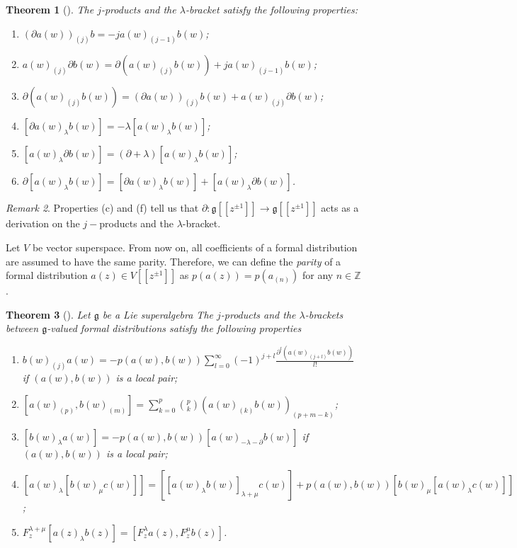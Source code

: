 \documentclass[a4paper, 12pt, reqno]{amsart}
\newtheorem{theorem}{Theorem}[subsection]
\theoremstyle{remark}
\newtheorem{remark}[theorem]{Remark}
\numberwithin{equation}{subsection}
\begin{document}
\begin{theorem}[{\cite[\S2.3]{nozaradan_introduction_2008}}]
  \label{thr:3}
  The $j$-products and the $\lambda$-bracket satisfy the following properties:
  \begin{enumerate}
  \item $(\partial a(w))_{(j)}b = -ja(w)_{(j - 1)}b(w)$;
  \item $a(w)_{(j)}\partial b(w) = \partial(a(w)_{(j)}b(w)) + ja(w)_{(j - 1)}b(w)$;
  \item $\partial(a(w)_{(j)}b(w))=(\partial a(w))_{(j)}b(w)+a(w)_{(j)}\partial b(w)$;
  \item $[\partial a(w)_{\lambda}b(w)] = -\lambda [a(w)_{\lambda}b(w)]$;
  \item $[a(w)_{\lambda}\partial b(w)] = (\partial + \lambda)[a(w)_{\lambda}b(w)]$;
  \item $\partial[a(w)_\lambda b(w)]=[\partial a(w)_\lambda b(w)]+[a(w)_\lambda \partial b(w)]$.
  \end{enumerate}
\end{theorem}
\begin{remark}
  \label{rmk:3}
  Properties (c) and (f) tell us that $\partial: \mathfrak{g}[[z^{\pm 1}]] \to \mathfrak{g}[[z^{\pm 1}]]$ acts as a derivation on the $j-$products and the $\lambda$-bracket.
\end{remark}

Let $V$ be vector superspace.
From now on, all coefficients of a formal distribution are assumed to have the same parity.
Therefore, we can define the \emph{parity} of a formal distribution $a(z) \in V[[z^{\pm 1}]]$ as $p(a(z)) = p(a_{(n)})$ for any $n \in \mathbb{Z}$.

\begin{theorem}[{\cite[\S2.3]{nozaradan_introduction_2008}}]
  \label{thr:4}
  Let $\mathfrak{g}$ be a Lie superalgebra
  The $j$-products and the $\lambda$-brackets between $\mathfrak{g}$-valued formal distributions satisfy the following properties
  \begin{enumerate}
  \item $b(w)_{(j)}a(w) = -p(a(w), b(w))\sum_{l = 0}^{\infty}(-1)^{j + l}\frac{\partial^l(a(w)_{(j + l)}b(w))}{l!}$ if $(a(w), b(w))$ is a local pair;
  \item $[a(w)_{(p)}, b(w)_{(m)}] = \sum_{k = 0}^p\binom{p}{k}(a(w)_{(k)}b(w))_{(p + m - k)}$;
  \item $[b(w)_{\lambda}a(w)] = -p(a(w), b(w))[a(w)_{-\lambda - \partial}b(w)]$ if $(a(w), b(w))$ is a local pair;
  \item $[a(w)_{\lambda}[b(w)_{\mu}c(w)]] = [[a(w)_{\lambda}b(w)]_{\lambda + \mu}c(w)] + p(a(w), b(w))[b(w)_{\mu}[a(w)_{\lambda}c(w)]]$;
  \item $F^{\lambda + \mu}_z[a(z)_{\lambda}b(z)] = [F^{\lambda}_za(z), F^{\mu}_zb(z)]$.
  \end{enumerate}
\end{theorem}
\end{document}
